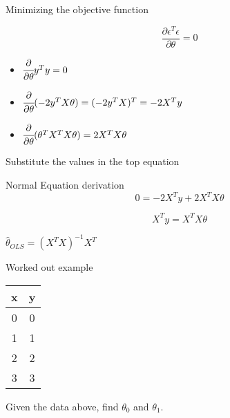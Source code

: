 \documentclass{beamer}
\begin{document}
\begin{frame}{Minimizing the objective function}
    
    
    \begin{equation}
        \frac{\partial \epsilon^{T} \epsilon}{\partial \theta} = 0    
    \end{equation}
    
    
    
    \begin{itemize}
        \item $
    \cfrac{\partial }{\partial \theta} y^{T}y= 0
    $
    \item $
    \cfrac{\partial }{\partial \theta}(-2y^{T}X\theta ) = (-2y^{T}X)^{T} = -2X^{T}y
    $
    \item $ \cfrac{\partial}{\partial\theta} (\theta^{T}X^{T}X\theta) = 2X^{T}X\theta$
    \end{itemize}
    
    Substitute the values in the top equation
    
\end{frame}

\begin{frame}{Normal Equation derivation}
$$
    0 = -2X^{T}y + 2X^{T}X\theta
$$

$$
    X^{T}y  = X^{T}X\theta
$$

\begin{tcolorbox}
\begin{center}
    

        $\hat{\theta}_{OLS} = (X^{T}X)^{-1}X^{T}$
\end{center}
\end{tcolorbox}

\end{frame}

\begin{frame}{Worked out example}
    \begin{center}
 \begin{tabular}{||c c||} 
 \hline
 x  & y \\ [0.5ex] 
 \hline\hline
 0 & 0 \\
 1 & 1 \\
 2 & 2 \\
 3 & 3 \\
 \hline
\end{tabular}
\end{center}

Given the data above, find $\theta_{0}$ and $\theta_{1}$.

\end{frame}
\end{document}
